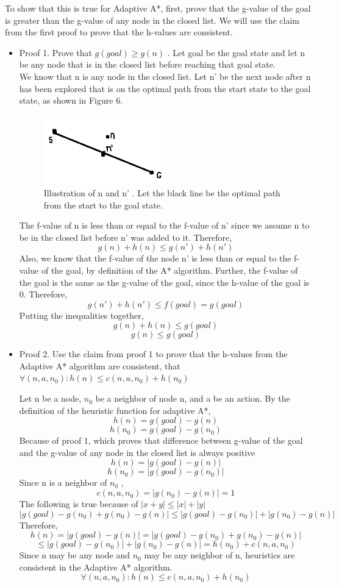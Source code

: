 \documentclass{article}
\begin{document}
To show that this is true for Adaptive A*, first, prove that the g-value of the goal is greater than the g-value of any node in the closed list. We will use the claim from the first proof to prove that the h-values are consistent.

\begin{itemize}
	\item Proof 1. Prove that $g(goal) \geq g(n) $ . Let goal be the goal state and let n be any node that is in the closed list before reaching that goal state.\\
	
	We know that n is any node in the closed list. Let n' be the next node after n has been explored that is on the optimal path from the start state to the goal state, as shown in Figure 6.

	\begin{figure}[h!]
  		\includegraphics[width=0.5\textwidth]{p4_0.png}
 		 \caption{Illustration of n and n' . Let the black line be the optimal path from the start to the goal state.}
	\end{figure}

	The f-value of n is less than or equal to the f-value of n' since we assume n to be in the closed list before n' was added to it. Therefore,
	\[ g(n)+h(n) \leq g(n')+h(n') \]
	 Also, we know that the f-value of the node n' is less than or equal to the f-value of the goal, by definition of the A* algorithm. Further, the f-value of the goal is the same as the g-value of the goal, since the h-value of the goal is 0. Therefore, 
	\[g(n') +h(n') \leq f(goal)=g(goal) \]
	Putting the inequalities together, 
	\[g(n)+h(n) \leq g(goal) \]
	\[g(n) \leq g(goal) \]

	\item Proof 2. Use the claim from proof 1 to prove that the h-values from the Adaptive A* algorithm are consistent, that $ \forall (n,a,n_0): h(n) \leq  c(n,a,n_0)+h(n_0)$
	
	Let n be a node, $n_0$ be a neighbor of node n, and a be an action.
	By the definition of the heuristic function for adaptive A*, 
	\[h(n)=g(goal)-g(n) \]
	\[h(n_0)=g(goal)-g(n_0) \]
	Because of proof 1, which proves that difference between g-value of the goal and the g-value of any node in the closed list is always positive
	\[h(n)=|g(goal)-g(n)| \]
	\[h(n_0)=|g(goal)-g(n_0)| \]
	Since n is a neighbor of $n_0$ ,
	\[c(n,a,n_0)=|g(n_0)-g(n)|=1 \]
	The following is true because of $|x+y|\leq|x|+|y|$
	\[|g(goal)-g(n_0)+g(n_0)-g(n)| \leq |g(goal)-g(n_0)|+|g(n_0)-g(n)| \]
	Therefore, 
	\[ h(n)= |g(goal)-g(n)| = |g(goal)-g(n_0)+g(n_0)-g(n)|  \]
	\[ \leq |g(goal)-g(n_0)|+|g(n_0)-g(n)|=h(n_0)+c(n,a,n_0) \]
	Since n may be any node and $n_0$ may be any neighbor of n, heuristics are consistent in the Adaptive A* algorithm.
	\[ \forall (n,a,n_0): h(n) \leq  c(n,a,n_0)+h(n_0)\]


\end{itemize}
\end{document}

